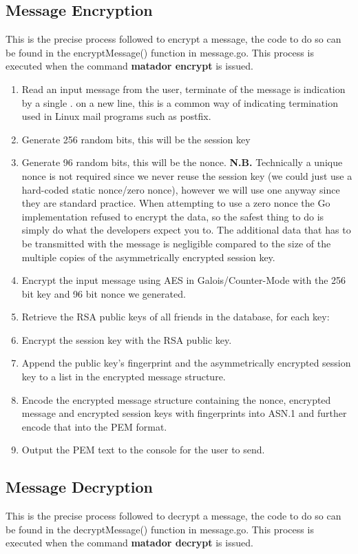 \documentclass{article}[12pt]
\begin{document}
		\subsection{Message Encryption}
			This is the precise process followed to encrypt a message, the code to do so can be found in the encryptMessage() function in message.go. This process is executed when the command \textbf{matador encrypt} is issued.
			
			\begin{enumerate}
				\item Read an input message from the user, terminate of the message is indication by a single . on a new line, this is a common way of indicating termination used in Linux mail programs such as postfix.
				\item Generate 256 random bits, this will be the session key
				\item Generate 96 random bits, this will be the nonce. \textbf{N.B.} Technically a unique nonce is not required since we never reuse the session key (we could just use a hard-coded static nonce/zero nonce), however we will use one anyway since they are standard practice. When attempting to use a zero nonce the Go implementation refused to encrypt the data, so the safest thing to do is simply do what the developers expect you to. The additional data that has to be transmitted with the message is negligible compared to the size of the multiple copies of the asymmetrically encrypted session key.
				\item Encrypt the input message using AES in Galois/Counter-Mode with the 256 bit key and 96 bit nonce we generated.
				\item Retrieve the RSA public keys of all friends in the database, for each key:
					\item Encrypt the session key with the RSA public key.
					\item Append the public key's fingerprint and the asymmetrically encrypted session key to a list in the encrypted message structure.
				\item Encode the encrypted message structure containing the nonce, encrypted message and encrypted session keys with fingerprints into ASN.1 and further encode that into the PEM format.
				\item Output the PEM text to the console for the user to send.
			\end{enumerate}
		
		\subsection{Message Decryption}
			This is the precise process followed to decrypt a message, the code to do so can be found in the decryptMessage() function in message.go. This process is executed when the command \textbf{matador decrypt} is issued.
			
\end{document}
